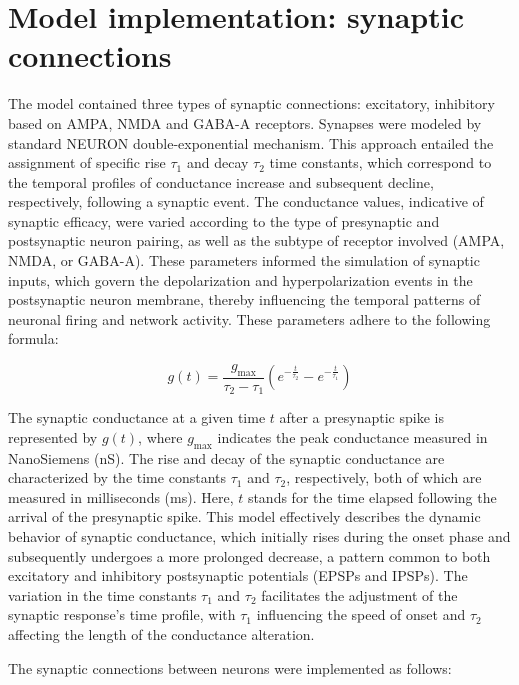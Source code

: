 \section{Model implementation: synaptic connections}
The model contained three types of synaptic connections: excitatory, inhibitory
based on AMPA, NMDA and GABA-A receptors. Synapses were modeled by standard
NEURON double-exponential mechanism. This approach entailed the assignment of
specific rise \(\tau_1\) and decay \(\tau_2\) time constants, which correspond
to the temporal profiles of conductance increase and subsequent decline,
respectively, following a synaptic event. The conductance values, indicative of
synaptic efficacy, were varied according to the type of presynaptic and
postsynaptic neuron pairing, as well as the subtype of receptor involved (AMPA,
NMDA, or GABA-A). These parameters informed the simulation of synaptic inputs,
which govern the depolarization and hyperpolarization events in the
postsynaptic neuron membrane, thereby influencing the temporal patterns of
neuronal firing and network activity. These parameters adhere to the following formula:

\begin{equation}
    g(t) = \frac{g_{\text{max}}}{\tau_2 - \tau_1} \left( e^{-\frac{t}{\tau_2}} - e^{-\frac{t}{\tau_1}} \right)
    \end{equation}

The synaptic conductance at a given time \(t\) after a presynaptic spike is represented by \(g(t)\), where \(g_{\text{max}}\) indicates the peak conductance measured in NanoSiemens (nS). 
The rise and decay of the synaptic conductance are characterized by the time constants \(\tau_1\) and \(\tau_2\), respectively, both of which are measured in milliseconds (ms). 
Here, \(t\) stands for the time elapsed following the arrival of the presynaptic spike. 
This model effectively describes the dynamic behavior of synaptic conductance, which initially rises during the onset phase and subsequently undergoes a more prolonged decrease, a pattern common to both excitatory and inhibitory postsynaptic potentials (EPSPs and IPSPs). 
The variation in the time constants \(\tau_1\) and \(\tau_2\) facilitates the adjustment of the synaptic response's time profile, with \(\tau_1\) influencing the speed of onset and \(\tau_2\) affecting the length of the conductance alteration.
\pagebreak

\noindent
The synaptic connections between neurons were implemented
as follows:


